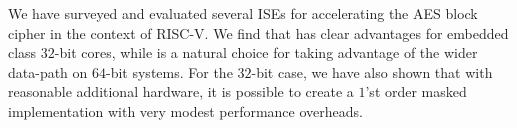 
We have surveyed and evaluated several ISEs for accelerating
the AES block cipher in the context of RISC-V.
We find that  has clear advantages for embedded class
$32$-bit cores, while  is a natural choice for taking
advantage of the wider data-path on $64$-bit systems.
For the $32$-bit case, we have also shown that with reasonable additional
hardware, it is possible to create a $1$'st order masked implementation with
very modest performance overheads.

